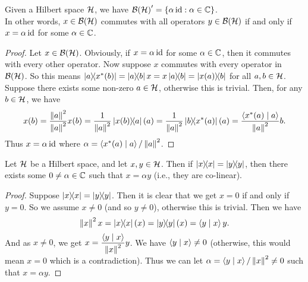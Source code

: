  \begin{lemma}\label{continuous_linear_map.centralizer}\leanok
  Given a Hilbert space $\mathcal{H}$, we have ${\mathcal{B}(\mathcal{H})}^\prime=\{\alpha\operatorname{id}:\alpha\in\mathbb{C}\}$.\\
  In other words, $x\in\mathcal{B}(\mathcal{H})$ commutes with all operators $y\in\mathcal{B}(\mathcal{H})$ if and only if $x=\alpha\operatorname{id}$ for some $\alpha\in\mathbb{C}$.
 \end{lemma}
 \begin{proof}\leanok
  Let $x\in\mathcal{B}(\mathcal{H})$. Obviously, if $x=\alpha\operatorname{id}$ for some $\alpha\in\mathbb{C}$, then it commutes with every other operator. Now suppose $x$ commutes with every operator in $\mathcal{B}(\mathcal{H})$.
  So this means $\ketbra{a}{x^*(b)}=\ketbra{a}{b}x=x\ketbra{a}{b}=\ketbra{x(a)}{b}$ for all $a,b\in\mathcal{H}$.
  Suppose there exists some non-zero $a\in\mathcal{H}$, otherwise this is trivial. Then, for any $b\in\mathcal{H}$, we have
  \[x(b)=\frac{\left\|a\right\|^2}{\left\|a\right\|^2}x(b)=\frac{1}{\left\|a\right\|^2}\left\lvert x(b)\right\rangle\!\!\left\langle a\right\rvert(a)=\frac{1}{\left\|a\right\|^2}\left\lvert b\right\rangle\!\!\left\langle x^*(a)\right\rvert(a)=\frac{\left\langle x^*(a) \mid a\right\rangle}{\left\|a\right\|^2}b.\]
  Thus $x=\alpha\operatorname{id}$ where $\alpha=\left\langle x^*(a) \mid a\right\rangle/\left\|a\right\|^2$.
 \end{proof}

 \begin{proposition}\label{colinear_of_rankOne_self_eq_rankOne_self}\leanok
  Let $\mathcal{H}$ be a Hilbert space, and let $x,y\in\mathcal{H}$. Then if $\left\lvert x\right\rangle\!\!\left\langle x\right\rvert=\left\lvert y\right\rangle\!\!\left\langle y\right\rvert$, then there exists some $0\neq\alpha\in\mathbb{C}$ such that $x=\alpha{y}$ (i.e., they are co-linear).
 \end{proposition}
 \begin{proof}\leanok
  Suppose $\left\lvert x\right\rangle\!\!\left\langle x\right\rvert=\left\lvert y\right\rangle\!\!\left\langle y\right\rvert$. Then it is clear that we get $x=0$ if and only if $y=0$. So we assume $x\neq0$ (and so $y\neq0$), otherwise this is trivial.
  Then we have \[\left\|x\right\|^2x=\left\lvert x\right\rangle\!\!\left\langle x\right\rvert(x)=\left\lvert y\right\rangle\!\!\left\langle y\right\rvert(x)=\left\langle y \mid x\right\rangle y.\]
  And as $x\neq0$, we get $x=\dfrac{\left\langle y \mid x\right\rangle}{\left\|x\right\|^2}y$. We have $\left\langle y \mid x\right\rangle\neq0$ (otherwise, this would mean $x=0$ which is a contradiction). Thus we can let $\alpha=\left\langle y \mid x\right\rangle/\left\|x\right\|^2\neq0$ such that $x=\alpha{y}$.
 \end{proof}
